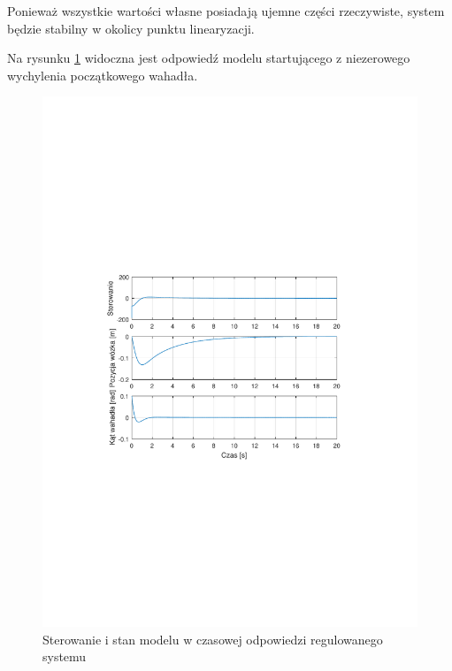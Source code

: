 \documentclass[12pt]{article}
\begin{document}
Ponieważ wszystkie wartości własne posiadają ujemne części rzeczywiste, system
będzie stabilny w okolicy punktu linearyzacji.

\newpage

Na rysunku \ref{rys:lq_response_model} widoczna jest odpowiedź modelu
startującego z niezerowego wychylenia początkowego wahadła.

\begin{figure}[!htb]
    \begin{center}
        \includegraphics[width=16cm,trim=3cm 9cm 3cm 9cm,clip]
        {../res/img/lq_response_model.pdf}
    \end{center}
    \caption{Sterowanie i stan modelu w czasowej odpowiedzi regulowanego
    systemu}
    \label{rys:lq_response_model}
\end{figure}

\newpage
\end{document}
